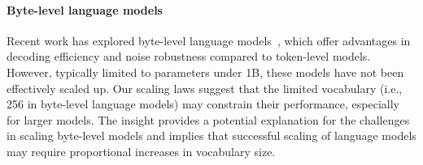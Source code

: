 \paragraph{Byte-level language models}

Recent work has explored byte-level language models~\citep{yu2024megabyte,wang2024mambabyte}, which offer advantages in decoding efficiency and noise robustness compared to token-level models. However, typically limited to parameters under 1B, these models have not been effectively scaled up.
Our scaling laws suggest that the limited vocabulary (i.e., 256 in byte-level language models) may constrain their performance, especially for larger models. The insight provides a potential explanation for the challenges in scaling byte-level models and implies that successful scaling of language models may require proportional increases in vocabulary size.

